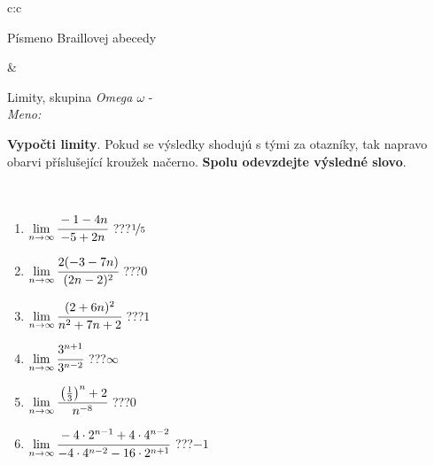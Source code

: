 \documentclass[10pt]{report}
\begin{document}
\begin{tabular}{c:c}
\begin{minipage}[c][104.5mm][t]{0.5\linewidth}
\begin{center}
\begin{minipage}{0.20\linewidth}
\begin{center}
{\small Písmeno Braillovej abecedy}
\end{center}
\end{minipage}
\end{center}
\end{minipage}
&
\begin{minipage}[c][104.5mm][t]{0.5\linewidth}
\begin{center}
\vspace{7mm}
{\huge Limity, skupina \textit{Omega $\omega$} -}\\[5mm]
\textit{Meno:}\phantom{xxxxxxxxxxxxxxxxxxxxxxxxxxxxxxxxxxxxxxxxxxxxxxxxxxxxxxxxxxxxxxxxx}\\[5mm]
\begin{minipage}{0.95\linewidth}
\begin{center}
\textbf{Vypočti limity}. Pokud se výsledky shodujú s tými za otazníky, tak napravo\\obarvi příslušející kroužek načerno. \textbf{Spolu odevzdejte výsledné slovo}.
\end{center}
\end{minipage}
\\[1mm]
\begin{minipage}{0.79\linewidth}
\begin{center}
\begin{varwidth}{\linewidth}
\begin{enumerate}
\normalsize
\item $\lim\limits_{n\to\infty}\cfrac{-1-4n}{-5+2n}$\quad \dotfill\; ???\;\dotfill \quad $\nicefrac{1}{5}$
\item $\lim\limits_{n\to\infty}\cfrac{2(-3-7n)}{(2n-2)^2}$\quad \dotfill\; ???\;\dotfill \quad $0$
\item $\lim\limits_{n\to\infty}\cfrac{(2+6n)^2}{n^2+7n+2}$\quad \dotfill\; ???\;\dotfill \quad $1$
\item $\lim\limits_{n\to\infty}\cfrac{3^{n+1}}{3^{n-2}}$\quad \dotfill\; ???\;\dotfill \quad $\infty$
\item $\lim\limits_{n\to\infty}\cfrac{\left(\frac{1}{3}\right)^n +2}{n^{-8}}$\quad \dotfill\; ???\;\dotfill \quad $0$
\item $\lim\limits_{n\to\infty}\cfrac{-4\cdot 2^{n-1}+4\cdot 4^{n-2}}{-4\cdot 4^{n-2}-16\cdot 2^{n+1}}$\quad \dotfill\; ???\;\dotfill \quad $-1$
\end{enumerate}
\end{varwidth}
\end{center}
\end{minipage}
\begin{minipage}{0.20\linewidth}

\end{minipage}
\end{center}
\end{minipage}
\end{tabular}
\end{document}
